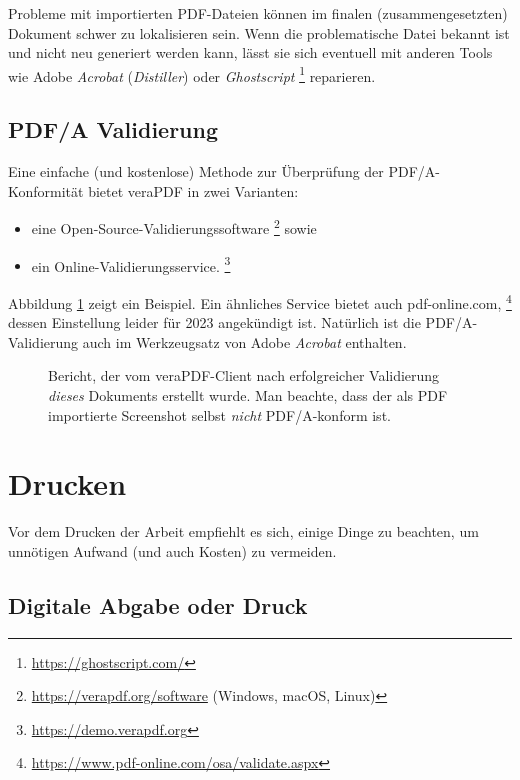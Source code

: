 Probleme mit importierten PDF-Dateien können im finalen (zusammengesetzten) Dokument
schwer zu lokalisieren sein. Wenn die problematische Datei bekannt ist und nicht 
neu generiert werden kann, lässt sie sich eventuell mit anderen Tools wie Adobe \emph{Acrobat} 
(\emph{Distiller}) oder \emph{Ghostscript}%
\footnote{\url{https://ghostscript.com/}}
reparieren.


\subsection{PDF/A Validierung}
\label{sec:PDFA-validation}

Eine einfache (und kostenlose) Methode zur Überprüfung der PDF/A-Konformität bietet
\textsf{veraPDF} in zwei Varianten:
%
\begin{itemize}
\item eine Open-Source-Validierungssoftware%
  \footnote{\url{https://verapdf.org/software} (Windows, macOS, Linux)} sowie
\item ein Online-Validierungsservice.%
  \footnote{\url{https://demo.verapdf.org}}
\end{itemize}
%
Abbildung \ref{fig:verapdf-report} zeigt ein Beispiel. Ein ähnliches Service bietet
auch \textsf{pdf-online.com},%
\footnote{\url{https://www.pdf-online.com/osa/validate.aspx}}
dessen Einstellung leider für 2023 angekündigt ist.
Natürlich ist die PDF/A-Validierung auch im Werkzeugsatz von Adobe \emph{Acrobat} enthalten.

\begin{figure}[htbp]
    \centering
    \caption{Bericht, der vom \textsf{veraPDF}-Client nach erfolgreicher Validierung 
    \emph{dieses} Dokuments erstellt wurde. Man beachte, dass der als PDF importierte Screenshot 
    selbst \emph{nicht} PDF/A-konform ist.}
    \label{fig:verapdf-report}
\end{figure}


\section{Drucken}

Vor dem Drucken der Arbeit empfiehlt es sich, einige Dinge zu beachten, um
unnötigen Aufwand (und auch Kosten) zu vermeiden.

\subsection{Digitale Abgabe oder Druck}

